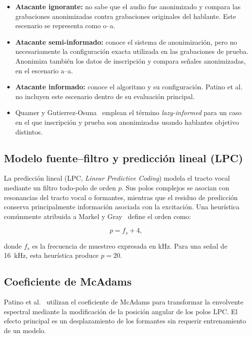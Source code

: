 \documentclass[10pt,twocolumn]{article}
\begin{document}
\begin{itemize}
    \item \textbf{Atacante ignorante:} no sabe que el audio fue anonimizado y
    compara las grabaciones anonimizadas contra grabaciones originales del
    hablante. Este escenario se representa como o--a.

    \item \textbf{Atacante semi-informado:} conoce el sistema de anonimización,
    pero no necesariamente la configuración exacta utilizada en las
    grabaciones de prueba. Anonimiza también los datos de inscripción y compara
    señales anonimizadas, en el escenario a--a.

    \item \textbf{Atacante informado:} conoce el algoritmo y su configuración.
    Patino et al.~\cite{patino2021} no incluyen este escenario dentro de su
    evaluación principal.

    \item Quamer y Gutierrez-Osuna~\cite{quamer2024} emplean el término
    \textit{lazy-informed} para un caso en el que inscripción y prueba son
    anonimizadas usando hablantes objetivo distintos.
\end{itemize}

\subsection{Modelo fuente--filtro y predicción lineal (LPC)}

La predicción lineal (LPC, \textit{Linear Predictive Coding}) modela el tracto
vocal mediante un filtro todo-polo de orden $p$. Sus polos complejos se asocian
con resonancias del tracto vocal o formantes, mientras que el residuo de
predicción conserva principalmente información asociada con la excitación. Una
heurística comúnmente atribuida a Markel y Gray~\cite{markel1976linear} define
el orden como:

\begin{equation}
    p = f_s + 4,
    \label{eq:lpc-order}
\end{equation}

donde $f_s$ es la frecuencia de muestreo expresada en kHz. Para una señal de
16~kHz, esta heurística produce $p=20$.

\subsection{Coeficiente de McAdams}

Patino et al.~\cite{patino2021} utilizan el coeficiente de McAdams para
transformar la envolvente espectral mediante la modificación de la posición
angular de los polos LPC. El efecto principal es un desplazamiento de los
formantes sin requerir entrenamiento de un modelo.
\end{document}

